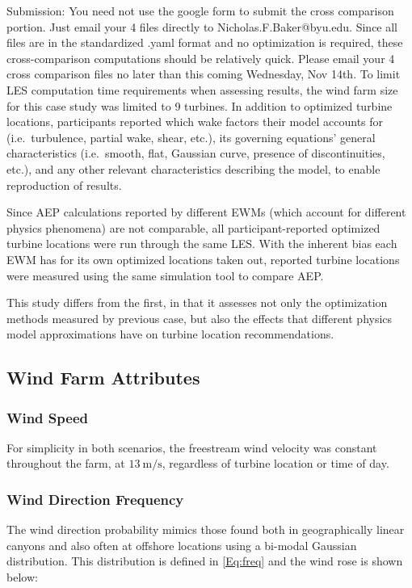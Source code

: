 \documentclass[]{aiaa-tc}
\begin{document}
Submission:
You need not use the google form to submit the cross comparison portion. Just email your 4 files directly to Nicholas.F.Baker@byu.edu. Since all files are in the standardized .yaml format and no optimization is required, these cross-comparison computations should be relatively quick. Please email your 4 cross comparison files no later than this coming Wednesday, Nov 14th.
To limit LES computation time requirements when assessing results, the wind farm size for this case study was limited to 9 turbines. In addition to optimized turbine locations, participants reported which wake factors their model accounts for (i.e.~turbulence, partial wake, shear, etc.), its governing equations' general characteristics (i.e.~smooth, flat, Gaussian curve, presence of discontinuities, etc.), and any other relevant characteristics describing the model, to enable reproduction of results.

Since AEP calculations reported by different EWMs (which account for different physics phenomena) are not comparable, all participant-reported optimized turbine locations were run through the same LES. With the inherent bias each EWM has for its own optimized locations taken out, reported turbine locations were measured using the same simulation tool to compare AEP.

This study differs from the first, in that it assesses not only the optimization methods measured by previous case, but also the effects that different physics model approximations have on turbine location recommendations.

\subsection{Wind Farm Attributes}

\subsubsection{Wind Speed}
For simplicity in both scenarios, the freestream wind velocity was constant throughout the farm, at $13\ \textrm{m/s}$, regardless of turbine location or time of day.

\subsubsection{Wind Direction Frequency}

The wind direction probability mimics those found both in geographically linear canyons and also often at offshore locations using a bi-modal Gaussian distribution. This distribution is defined in  \cref{Eq:freq} and the wind rose is shown below: %
\end{document}
